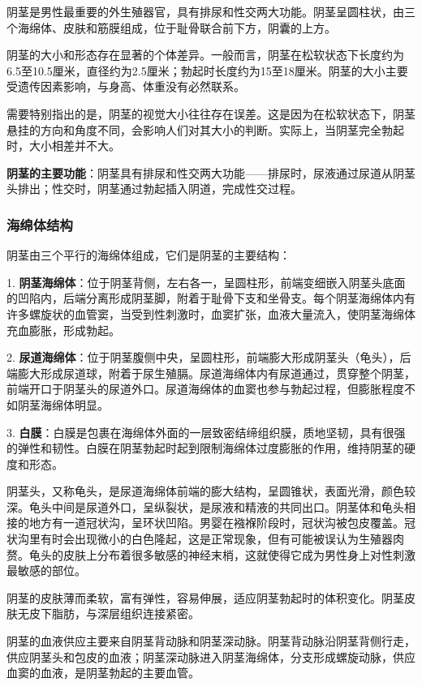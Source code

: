 阴茎是男性最重要的外生殖器官，具有排尿和性交两大功能。阴茎呈圆柱状，由三个海绵体、皮肤和筋膜组成，位于耻骨联合前下方，阴囊的上方。

阴茎的大小和形态存在显著的个体差异。一般而言，阴茎在松软状态下长度约为6.5至10.5厘米，直径约为2.5厘米；勃起时长度约为15至18厘米。阴茎的大小主要受遗传因素影响，与身高、体重没有必然联系。

需要特别指出的是，阴茎的视觉大小往往存在误差。这是因为在松软状态下，阴茎悬挂的方向和角度不同，会影响人们对其大小的判断。实际上，当阴茎完全勃起时，大小相差并不大。

\textbf{阴茎的主要功能}：阴茎具有排尿和性交两大功能——排尿时，尿液通过尿道从阴茎头排出；性交时，阴茎通过勃起插入阴道，完成性交过程。

\subsubsection{海绵体结构}

阴茎由三个平行的海绵体组成，它们是阴茎的主要结构：

1. \textbf{阴茎海绵体}：位于阴茎背侧，左右各一，呈圆柱形，前端变细嵌入阴茎头底面的凹陷内，后端分离形成阴茎脚，附着于耻骨下支和坐骨支。每个阴茎海绵体内有许多螺旋状的血管窦，当受到性刺激时，血窦扩张，血液大量流入，使阴茎海绵体充血膨胀，形成勃起。

2. \textbf{尿道海绵体}：位于阴茎腹侧中央，呈圆柱形，前端膨大形成阴茎头（龟头），后端膨大形成尿道球，附着于尿生殖膈。尿道海绵体内有尿道通过，贯穿整个阴茎，前端开口于阴茎头的尿道外口。尿道海绵体的血窦也参与勃起过程，但膨胀程度不如阴茎海绵体明显。

3. \textbf{白膜}：白膜是包裹在海绵体外面的一层致密结缔组织膜，质地坚韧，具有很强的弹性和韧性。白膜在阴茎勃起时起到限制海绵体过度膨胀的作用，维持阴茎的硬度和形态。

阴茎头，又称龟头，是尿道海绵体前端的膨大结构，呈圆锥状，表面光滑，颜色较深。龟头中间是尿道外口，呈纵裂状，是尿液和精液的共同出口。阴茎体和龟头相接的地方有一道冠状沟，呈环状凹陷。男婴在襁褓阶段时，冠状沟被包皮覆盖。冠状沟里有时会出现微小的白色隆起，这是正常现象，但有可能被误认为生殖器肉赘。龟头的皮肤上分布着很多敏感的神经末梢，这就使得它成为男性身上对性刺激最敏感的部位。

阴茎的皮肤薄而柔软，富有弹性，容易伸展，适应阴茎勃起时的体积变化。阴茎皮肤无皮下脂肪，与深层组织连接紧密。

阴茎的血液供应主要来自阴茎背动脉和阴茎深动脉。阴茎背动脉沿阴茎背侧行走，供应阴茎头和包皮的血液；阴茎深动脉进入阴茎海绵体，分支形成螺旋动脉，供应血窦的血液，是阴茎勃起的主要血管。

